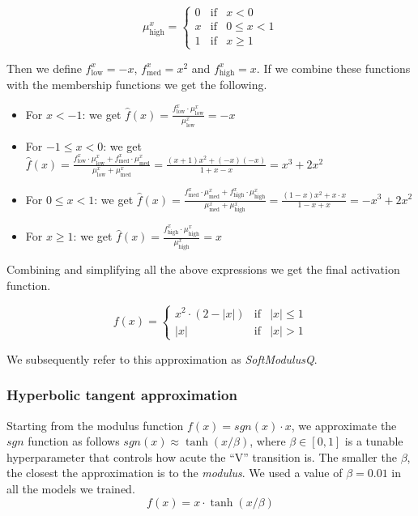 \begin{equation}
\label{eq:muhigh}
\mu^x_{\text{high}}= \left\{ \begin{array}{lcc}
0 &   \text{if}  & x < 0 \\
x & \text{if}  & 0 \leq x < 1 \\
1 &  \text{if} & x \geq 1
\end{array}
\right.
\end{equation}

Then we define $f^x_{\text{low}}=-x$, $f^x_{\text{med}}=x^2$ and $f^x_{\text{high}}=x$. If we combine these functions with the membership functions we get the following.

\begin{itemize}
	\item For $x < -1$: we get $\hat{f}(x)=\frac{f^x_{\text{low}} \cdot \mu^x_{\text{low}}}{\mu^x_{\text{low}}}=-x$

	\item For $-1\leq x < 0$: we get $\hat{f}(x)=\frac{f^x_{\text{low}} \cdot \mu^x_{\text{low}} + f^x_{\text{med}} \cdot \mu^x_{\text{med}}}{\mu^x_{\text{low}} + \mu^x_{\text{med}}}=\frac{(x+1)x^2+(-x)(-x)}{1+x-x}=x^3 + 2x^2$

	\item For $0\leq x < 1$: we get $\hat{f}(x)=\frac{f^x_{\text{med}} \cdot \mu^x_{\text{med}} + f^x_{\text{high}} \cdot \mu^x_{\text{high}}}{\mu^x_{\text{med}} + \mu^x_{\text{high}}}=\frac{(1-x)x^2+x\cdot x}{1-x+x}=-x^3 + 2x^2$

	\item For $x \geq 1$: we get $\hat{f}(x)=\frac{f^x_{\text{high}} \cdot \mu^x_{\text{high}}}{\mu^x_{\text{high}}}=x$
\end{itemize}

Combining and simplifying all the above expressions we get the final activation function.

$$
f(x)= \left\{ \begin{array}{lcc}
x^2 \cdot (2-|x|) &  \text{if} & |x| \leq 1 \\
|x| &   \text{if}  & |x| > 1
\end{array}
\right.
$$




We  subsequently refer to this approximation as \textit{SoftModulusQ}.

\subsubsection{Hyperbolic tangent approximation}
Starting from the modulus function $f(x)=sgn(x)\cdot x$, we approximate the $sgn$ function as follows $sgn(x) \approx \tanh(x/\beta)$, where $\beta \in [0, 1]$ is a tunable hyperparameter that controls how acute the ``V'' transition is. The smaller the $\beta$, the closest the approximation is to the \textit{modulus}. We used a value of $\beta=0.01$ in all the models we trained.
	$$f(x) = x \cdot \tanh(x/\beta)$$


